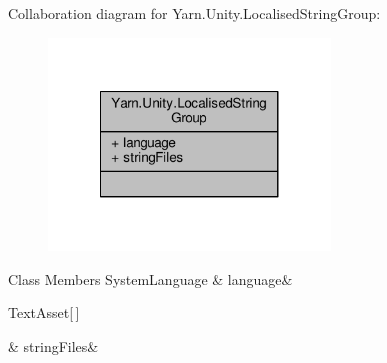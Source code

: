 Collaboration diagram for Yarn.\-Unity.\-Localised\-String\-Group\-:
\nopagebreak
\begin{figure}[H]
\begin{center}
\leavevmode
\includegraphics[width=212pt]{de/de9/a00322}
\end{center}
\end{figure}
\begin{DoxyFields}{Class Members}
\hypertarget{a00107_a395d808fa32cb4fe68a62d7852534e1a}{System\-Language}\label{a00107_a395d808fa32cb4fe68a62d7852534e1a}
&
language&
\\
\hline

\hypertarget{a00107_a636624112fd57fedda96d485d20e6b9e}{Text\-Asset\mbox{[}$\,$\mbox{]}}\label{a00107_a636624112fd57fedda96d485d20e6b9e}
&
string\-Files&
\\
\hline

\end{DoxyFields}
